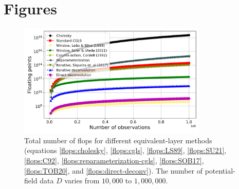 





%





\section{Figures}

\begin{figure}[htbp]
\begin{center}
\includegraphics[width=9cm]{Fig/flops_grav}%
\end{center}
\caption{
	Total number of flops for different equivalent-layer methods
	(equations \ref{flops:cholesky}, \ref{flops:cgls}, \ref{flops:LS89}, \ref{flops:SU21}, 
	\ref{flops:C92}, \ref{flops:reparameterization-cgls}, \ref{flops:SOB17}, \ref{flops:TOB20},
	and \ref{flops:direct-deconv}). 
	The number of potential-field data $D$ varies from $10,000$ to $1,000,000$.
	}
\label{fig:1}
\end{figure}

